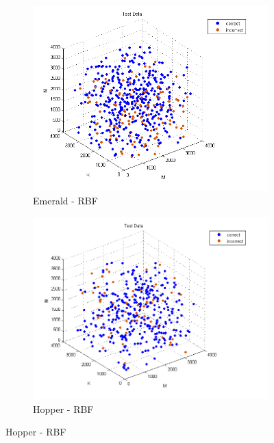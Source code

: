 \begin{figure}[t]
    \centering
        \begin{subfigure}[t]{0.33\textwidth}
            \includegraphics[width=\textwidth]{figures/emerald_test_rbf.png}
            \caption{Emerald - RBF}
            \label{f:classify_rbf_emerald}
        \end{subfigure}
        \begin{subfigure}[t]{0.33\textwidth}
            \includegraphics[width=\textwidth]{figures/hopper_test_rbf.png}
            \caption{Hopper - RBF}
            \label{f:classify_rbf_hopper}
        \end{subfigure}

\end{figure}
